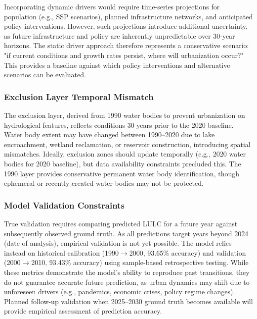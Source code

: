\documentclass[conference]{IEEEtran}
\begin{document}
Incorporating dynamic drivers would require time-series projections for population (e.g., SSP scenarios), planned infrastructure networks, and anticipated policy interventions. However, such projections introduce additional uncertainty, as future infrastructure and policy are inherently unpredictable over 30-year horizons. The static driver approach therefore represents a conservative scenario: "if current conditions and growth rates persist, where will urbanization occur?" This provides a baseline against which policy interventions and alternative scenarios can be evaluated.

\subsubsection{Exclusion Layer Temporal Mismatch}

The exclusion layer, derived from 1990 water bodies to prevent urbanization on hydrological features, reflects conditions 30 years prior to the 2020 baseline. Water body extent may have changed between 1990--2020 due to lake encroachment, wetland reclamation, or reservoir construction, introducing spatial mismatches. Ideally, exclusion zones should update temporally (e.g., 2020 water bodies for 2020 baseline), but data availability constraints precluded this. The 1990 layer provides conservative permanent water body identification, though ephemeral or recently created water bodies may not be protected.

\subsubsection{Model Validation Constraints}

True validation requires comparing predicted LULC for a future year against subsequently observed ground truth. As all predictions target years beyond 2024 (date of analysis), empirical validation is not yet possible. The model relies instead on historical calibration (1990$\rightarrow$2000, 93.65\% accuracy) and validation (2000$\rightarrow$2010, 93.43\% accuracy) using sample-based retrospective testing. While these metrics demonstrate the model's ability to reproduce past transitions, they do not guarantee accurate future prediction, as urban dynamics may shift due to unforeseen drivers (e.g., pandemics, economic crises, policy regime changes). Planned follow-up validation when 2025--2030 ground truth becomes available will provide empirical assessment of prediction accuracy.
\end{document}

